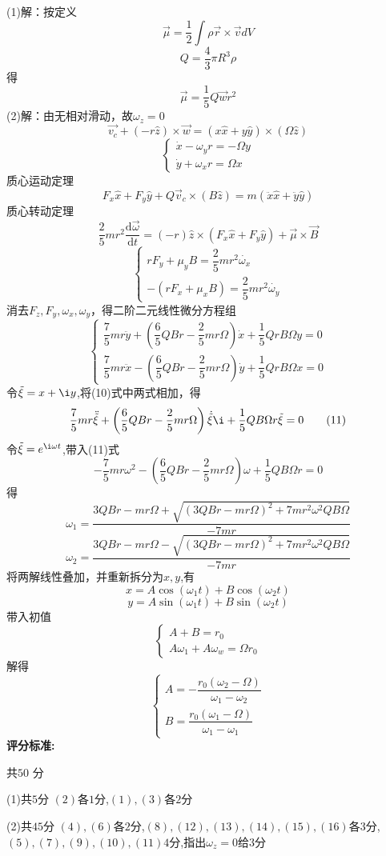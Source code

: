 \documentclass{article}
\begin{document}
\[\]
(1)解：按定义
\[\vec{\mu }=\dfrac{1}{2}\int \rho \vec{r}\times \vec{v}dV\tag{1}\]
\[Q=\dfrac{4}{3}\pi R^{3}\rho\tag{2}\]
得
\[\vec{\mu }=\dfrac{1}{5}Q\vec{w}r^{2}\tag{3}\]
(2)解：由无相对滑动，故$\omega_z=0$
\[\vec{v_{c}}+\left( -r\hat{z}\right) \times \vec{w}=\left( x\hat{x}+y\hat{y}\right) \times \left( \Omega \hat{z}\right) \tag{4}\]
\[
\begin{cases}
    \dot{x}-\omega_{y}r=-\Omega y\\
    \dot{y}+\omega_{x} r=\Omega x
\end{cases}
\tag{5}
\]
质心运动定理
\[
F_x \hat{x}+F_y\hat{y}+Q\vec{v}_{c}\times \left( B\hat{z}\right) =m\left( \ddot{x}\hat{x}+ \ddot{y}\hat{y}\right)
\tag{7}
\]
质心转动定理
\[
\dfrac{2}{5}mr^{2}\dfrac{\mathrm{d}\vec{\omega}}{\mathrm{d}t}=\left( -r\right) \hat{z}\times \left( F_{x}\hat{x}+F_{y}\hat{y}\right) +\vec{\mu }\times \vec{B}
\tag{8}
\]
\[
\begin{cases}
    rF_y+\mu _{y}B=\dfrac{2}{5}mr^{2}\dot{\omega_x}\\
    -\left( rF_{x}+\mu _{x}B\right) =\dfrac{2}{5}mr^{2}\dot{\omega_y}
\end{cases}
\tag{9}
\]
消去$F_z,F_y,\omega_x,\omega_y$，得二阶二元线性微分方程组
\[
\begin{cases}
    \dfrac{7}{5}mr\ddot{y}+\left( \dfrac{6}{5}QBr-\dfrac{2}{5}mr\Omega \right) \dot{x}+\dfrac{1}{5}QrB\Omega y=0\\
    \dfrac{7}{5}mr\ddot{x}-\left( \dfrac{6}{5}QBr-\dfrac{2}{5}mr\Omega \right) \dot{y}+\dfrac{1}{5}QrB\Omega x=0
\end{cases}
\tag{10}
\]
令$\tilde{\xi}=x+\i y$,将(10)式中两式相加，得
\[
\dfrac{7}{5}mr\ddot{\tilde{\xi}}+\left( \dfrac{6}{5}QBr-\dfrac{2}{5}mr\Omega \right)\dot{\tilde{\xi}}\i+\dfrac{1}{5}QB\Omega r\tilde{\xi}=0
\tag{11}
\]
令$\tilde{\xi}=e^{\i\omega t}$,带入(11)式
\[
-\dfrac{7}{5}mr\omega ^{2}-\left( \dfrac{6}{5}QBr -\dfrac{2}{5}mr\Omega \right) \omega +\dfrac{1}{5}QB\Omega r=0
\tag{12}
\]
得
\[
\omega_{1}=\dfrac{3QBr-mr\Omega +\sqrt{\left( 3QBr-mr\Omega \right) ^{2}+7mr^{2}\omega^{2}QB\Omega }}{-7mr}
\tag{13}
\]
\[
\omega_{2}=\dfrac{3QBr-mr\Omega -\sqrt{\left( 3QBr-mr\Omega \right) ^{2}+7mr^{2}\omega^{2}QB\Omega }}{-7mr}
\tag{14}
\]
将两解线性叠加，并重新拆分为$x,y$,有
\[
x=A\cos \left( \omega _{1}t\right) +B\cos\left( \omega_{2}t\right)
\]
\[
y=A\sin \left( \omega _{1}t\right) +B\sin\left( \omega_{2}t\right)
\]
带入初值
\[
\begin{cases}
    A+B=r_0\\
    A\omega _{1}+A\omega _{w}=\Omega r_{0}
\end{cases}
\tag{15}
\]
解得
\[
\begin{cases}
A=-\dfrac{r_{0}\left( \omega _{2}-\Omega \right) }{\omega _{1}-\omega _{2}}\\
B=\dfrac{r_{0}\left( \omega _{1}-\Omega \right) }{\omega _{1}-\omega _{1}}
\end{cases}
\tag{16}
\]
\textbf{评分标准:}\par
共$50$ 分\par
(1)共$5$分 $(2)$各$1$分,$(1),(3)$各$2$分\par
(2)共$45$分 $(4),(6)$各$2$分,$(8),(12),(13),(14),(15),(16)$各$3$分,$(5),(7),(9),(10),(11)$$4$分,指出$\omega_z=0$给$3$分\par
\end{document}
